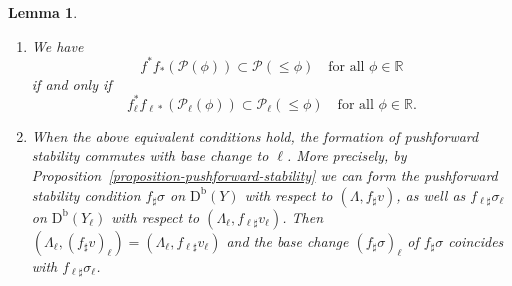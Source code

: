 \documentclass[11pt, reqno]{amsart}
\numberwithin{equation}{section}
\theoremstyle{plain}
\newtheorem{lemma}[theorem]{Lemma}
\theoremstyle{remark}
\theoremstyle{definition}
\theoremstyle{italicsname}
\newcommand{\Db}{\mathrm{D^b}}
\newcommand{\cP}{\mathscr{P}}
\def\RR{\ensuremath{\mathbb{R}}}
\begin{document}
\begin{lemma}
\begin{enumerate}[{\rm (1)}]
    \begin{enumerate}[label={\rm(2.\alph*)}]
        \item \label{base-change-pushforward-criterion} We have 
        \begin{equation}
        \label{eq:pull-f-k}
                f^*f_{*}(\cP(\phi))\subset \cP(\leq \phi) \quad \text{for all } \phi \in \RR
        \end{equation}
        if and only if 
        \begin{equation}\label{eq:pull-l}
                    f^*_{\ell}f_{\ell*}(\cP_{\ell}(\phi))\subset \cP_{\ell}(\leq \phi) \quad \text{for all } \phi \in \RR. 
        \end{equation}
        \item When the above equivalent conditions hold, the formation of pushforward stability commutes with base change to $\ell$. 
        More precisely, by Proposition~\ref{proposition-pushforward-stability} we can form the pushforward stability condition $f_{\sharp}\sigma$ on $\Db(Y)$ with respect to $(\Lambda, f_{\sharp} v)$, as well as $f_{\ell \sharp}\sigma_{\ell}$ on $\Db(Y_{\ell})$ with respect to $(\Lambda_{\ell}, f_{\ell \sharp} v_{\ell})$. 
        Then $(\Lambda_{\ell}, (f_{\sharp} v)_{\ell}) = (\Lambda_{\ell}, f_{\ell \sharp} v_{\ell})$ and the base change $(f_{\sharp} \sigma)_{\ell}$ of $f_{\sharp} \sigma$ coincides with $f_{\ell \sharp} \sigma_{\ell}$. 
    \end{enumerate}
\end{enumerate}
\end{lemma}
\end{document}
